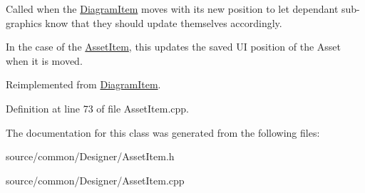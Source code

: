 Called when the \hyperlink{class_diagram_item}{Diagram\-Item} moves with its new position to let dependant sub-\/graphics know that they should update themselves accordingly. 

In the case of the \hyperlink{class_asset_item}{Asset\-Item}, this updates the saved U\-I position of the Asset when it is moved. 

Reimplemented from \hyperlink{class_diagram_item_aac2ecadd8d252d2c41b5308ff1af188b}{Diagram\-Item}.



Definition at line 73 of file Asset\-Item.\-cpp.



The documentation for this class was generated from the following files\-:\begin{DoxyCompactItemize}
\item 
source/common/\-Designer/Asset\-Item.\-h\item 
source/common/\-Designer/Asset\-Item.\-cpp\end{DoxyCompactItemize}
